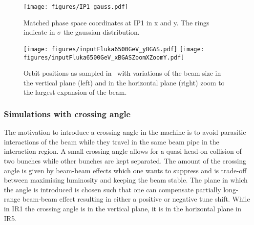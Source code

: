 \begin{figure}%
\begin{center}
\texttt{[image: figures/IP1\_gauss.pdf]}
\end{center}
\vspace{-0.6cm}
 \caption{Matched phase space coordinates at IP1 in x and y. The rings indicate in $\sigma$ the gaussian distribution.
  \label{ip1_gauss}}
\end{figure}


\begin{figure}[!htb]
\begin{center}
  \texttt{[image: figures/inputFluka6500GeV\_yBGAS.pdf]}
  \texttt{[image: figures/inputFluka6500GeV\_xBGASZoomXZoomY.pdf]}
\end{center}
\vspace{-0.6cm}
 \caption{Orbit positions as sampled in \fluka~with variations of the beam size in the vertical plane (left) and in the horizontal plane (right) zoom to the largest expansion of the beam.
  \label{BGASflukaInp}}
\end{figure}


\subsubsection{Simulations with crossing angle}
The motivation to introduce a crossing angle in the machine is to avoid parasitic interactions of the beam while they travel in the same beam pipe in the interaction region. A small crossing angle allows for a quasi head-on collision of two bunches while other bunches are kept separated. The amount of the crossing angle is given by beam-beam effects which one wants to suppress and is trade-off between maximising luminosity and keeping the beam stable. The plane in which the angle is introduced is chosen such that one can compensate partially long-range beam-beam effect resulting in either a positive or negative tune shift. While in IR1 the crossing angle is in the vertical plane, it is in the horizontal plane in IR5.

